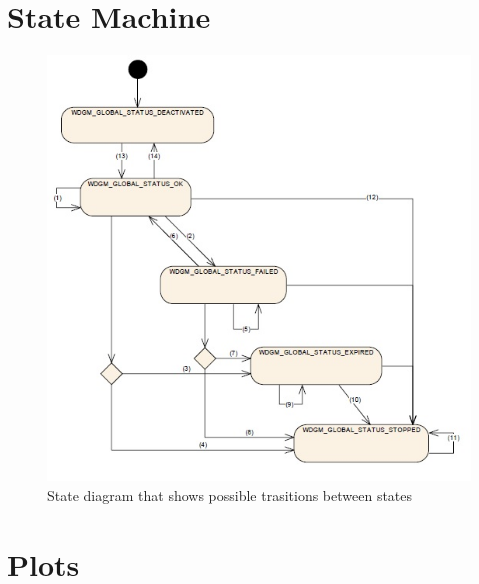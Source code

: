 
\section{State Machine}
\begin{figure}[h!]
\label{FIG:GLOBALSTATUSES}
\caption{State diagram that shows possible trasitions between states}
\begin{center}
\includegraphics{pictures/globalstatuses.jpg}
\end{center}
\end{figure}



\section{Plots}


